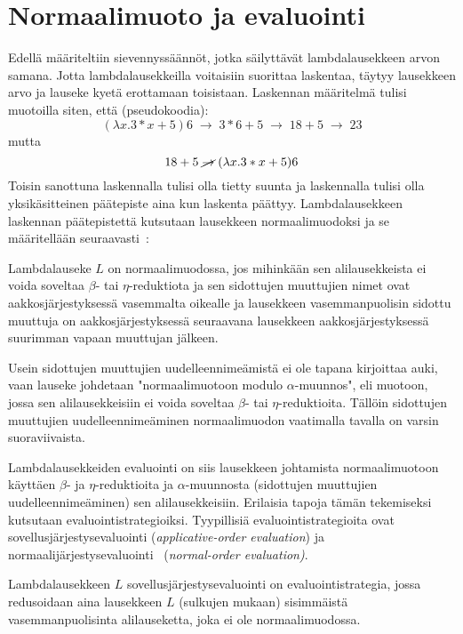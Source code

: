 \section{Normaalimuoto ja evaluointi}

Edellä määriteltiin sievennyssäännöt, jotka säilyttävät lambdalausekkeen arvon samana. Jotta lambdalausekkeilla voitaisiin suorittaa laskentaa, täytyy lausekkeen arvo ja lauseke kyetä erottamaan toisistaan. Laskennan määritelmä tulisi muotoilla siten, että (pseudokoodia):
\[ 
(\lambda x. 3 * x + 5) 6 \; \rightarrow \; 3 * 6 + 5 \; \rightarrow \; 18 + 5 \; \rightarrow \; 23 
\]
mutta 
\[ 18 + 5 \; \cancel{\rightarrow} \; (\lambda x. 3 * x + 5) 6 \]
Toisin sanottuna laskennalla tulisi olla tietty suunta ja laskennalla tulisi olla yksikäsitteinen päätepiste aina kun laskenta päättyy. Lambdalausekkeen laskennan päätepistettä kutsutaan lausekkeen normaalimuodoksi ja se määritellään seuraavasti~\cite[s.~9]{Hudak89}: 

\begin{maar}[normaalimuoto]
Lambdalauseke $L$ on normaalimuodossa, jos mihinkään sen alilausekkeista ei voida soveltaa $\beta$- tai $\eta$-reduktiota ja sen sidottujen muuttujien nimet ovat aakkosjärjestyksessä vasemmalta oikealle ja lausekkeen vasemmanpuolisin sidottu muuttuja on aakkosjärjestyksessä seuraavana lausekkeen aakkosjärjestyksessä suurimman vapaan muuttujan jälkeen.  
\end{maar}

Usein sidottujen muuttujien uudelleennimeämistä ei ole tapana kirjoittaa auki, vaan lauseke johdetaan "normaalimuotoon modulo $\alpha$-muunnos", eli muotoon, jossa sen alilausekkeisiin ei voida soveltaa $\beta$- tai $\eta$-reduktioita. Tällöin sidottujen muuttujien uudelleennimeäminen normaalimuodon vaatimalla tavalla on varsin suoraviivaista.
\par
Lambdalausekkeiden evaluointi on siis lausekkeen johtamista normaalimuotoon käyttäen $\beta$- ja $\eta$-reduktioita ja $\alpha$-muunnosta (sidottujen muuttujien uudelleennimeäminen) sen alilausekkeisiin. Erilaisia tapoja tämän tekemiseksi kutsutaan evaluointistrategioiksi. Tyypillisiä evaluointistrategioita ovat sovellusjärjestysevaluointi (\textit{applicative-order evaluation}) ja normaalijärjestysevaluointi~\cite[s.~ 10]{Hudak89} (\textit{normal-order evaluation)}.

\begin{alg}[sovellusjärjestysevaluointi] 
Lambdalausekkeen $L$ sovellusjärjestysevaluointi on evaluointistrategia, jossa redusoidaan aina lausekkeen $L$ (sulkujen mukaan) sisimmäistä vasemmanpuolisinta alilauseketta, joka ei ole normaalimuodossa.
\end{alg}

